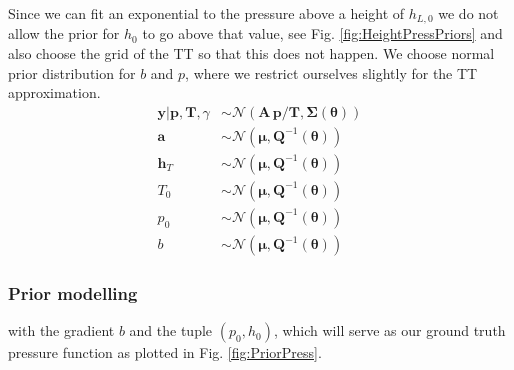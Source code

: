 Since we can fit an exponential to the pressure above a height of $h_{L,0}$ we do not allow the prior for $h_0$ to go above that value, see Fig. \ref{fig:HeightPressPriors} and also choose the grid of the TT so that this does not happen.
We choose normal prior distribution for $b$ and $p$, where we restrict ourselves slightly for the TT approximation.
\begin{subequations}
	\begin{align}
		\bm{y} |  \bm{p}, \bm{T}, \gamma &\sim \mathcal{N}(\bm{A} \, \bm{p}/\bm{T}, \bm{\Sigma}(\bm{\theta})) \label{eq:likelihoodPT} \\
		\bm{a}  &\sim \mathcal{N}(\bm{\mu}, \bm{Q}^{-1}(\bm{\theta}))\\
		\bm{h}_T  &\sim \mathcal{N}(\bm{\mu}, \bm{Q}^{-1}(\bm{\theta})) \\
		T_0  &\sim \mathcal{N}(\bm{\mu}, \bm{Q}^{-1}(\bm{\theta}))\\
		p_0  &\sim \mathcal{N}(\bm{\mu}, \bm{Q}^{-1}(\bm{\theta}))\\
		b  &\sim \mathcal{N}(\bm{\mu}, \bm{Q}^{-1}(\bm{\theta}))
	\end{align}
	\label{eq:BayMode}
\end{subequations}
\subsubsection{Prior modelling}

with the gradient $b$ and the tuple $(p_0,h_{0})$, which will serve as our ground truth pressure function as plotted in Fig. \ref{fig:PriorPress}.

